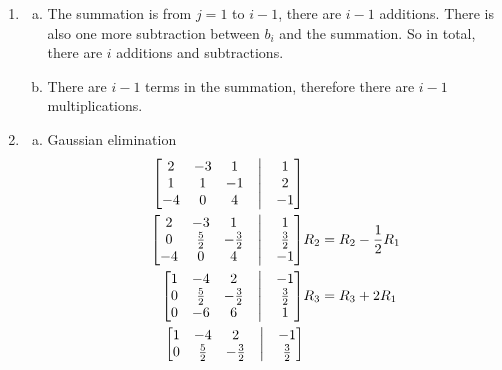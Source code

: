 \documentclass[12pt, letterpaper]{article}
\begin{document}
\begin{enumerate}
\begin{enumerate}[(a)]
\begin{align*}
                    LU\vec x &= LU\vec x
                \end{align*}
        \end{enumerate}
    \item %
        \begin{enumerate}[(a)]
            \item The summation is from $j=1$ to $i-1$, there are $i-1$ additions. There is also one more subtraction between $b_i$ and the summation. So in total, there are $i$ additions and subtractions.
            \item There are $i-1$ terms in the summation, therefore there are $i-1$ multiplications.
        \end{enumerate}
    \item %
        \begin{enumerate}[(a)]  
            \item Gaussian elimination
                \begin{align*}
                    \begin{bmatrix}
                        2  & -3 & 1  & \bigm| & 1\\
                        1  & 1  & -1  & \bigm| & 2\\
                        -4 & 0  & 4 & \bigm| & -1
                    \end{bmatrix}& \\
                    \begin{bmatrix}
                        2 & -3 & 1  & \bigm| & 1\\
                        0 &  \frac 52 & -\frac{3}2 & \bigm| & \frac32\\
                        -4 & 0 & 4  & \bigm| & -1
                    \end{bmatrix}& R_2 = R_2 - \frac12 R_1\\
                    \begin{bmatrix}
                        1 & -4 & 2  & \bigm| & -1\\
                        0 & \frac52  & -\frac32 & \bigm| & \frac32\\
                        0 & -6 & 6  & \bigm| & 1
                    \end{bmatrix}& R_3 = R_3 + 2R_1\\
                    \begin{bmatrix}
                        1 & -4 & 2  & \bigm| & -1\\
                        0 & \frac52  & -\frac32 & \bigm| & \frac32\\

\end{bmatrix}
\end{align*}
\end{enumerate}
\end{enumerate}
\end{document}
